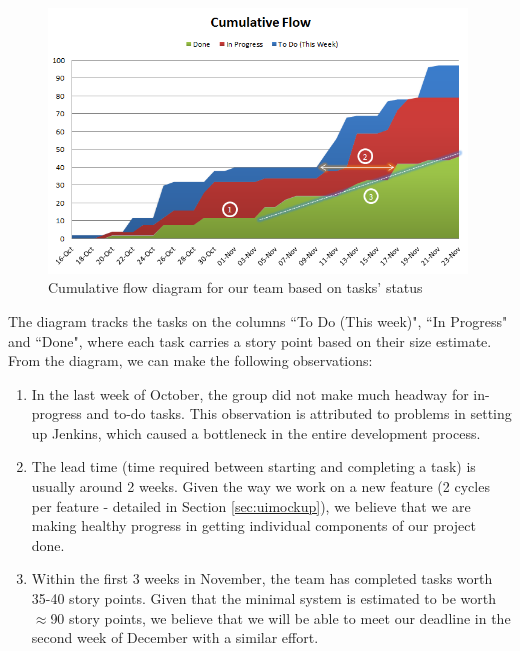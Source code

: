 \documentclass[a4paper, titlepage]{article}
\begin{document}
\begin{figure}[ht]
  \centering
    \includegraphics[width = 0.99\textwidth]{./eval/cumu_flow.png}
  \caption{Cumulative flow diagram for our team based on tasks' status}
  \label{fig:eval_cumuflow}
\end{figure}

The diagram tracks the tasks on the columns ``To Do (This week)", ``In Progress" and ``Done", where each task carries a story point based on their size estimate. From the diagram, we can make the following observations:

\begin{enumerate}

  \item In the last week of October, the group did not make much headway for in-progress and to-do tasks. This observation is attributed to problems in setting up Jenkins, which caused a bottleneck in the entire development process.

  \item The lead time (time required between starting and completing a task) is usually around 2 weeks. Given the way we work on a new feature (2 cycles per feature - detailed in Section \ref{sec:uimockup}), we believe that we are making healthy progress in getting individual components of our project done.

  \item Within the first 3 weeks in November, the team has completed tasks worth 35-40 story points. Given that the minimal system is estimated to be worth $\approx$90 story points, we believe that we will be able to meet our deadline in the second week of December with a similar effort.

\end{enumerate}
\end{document}
